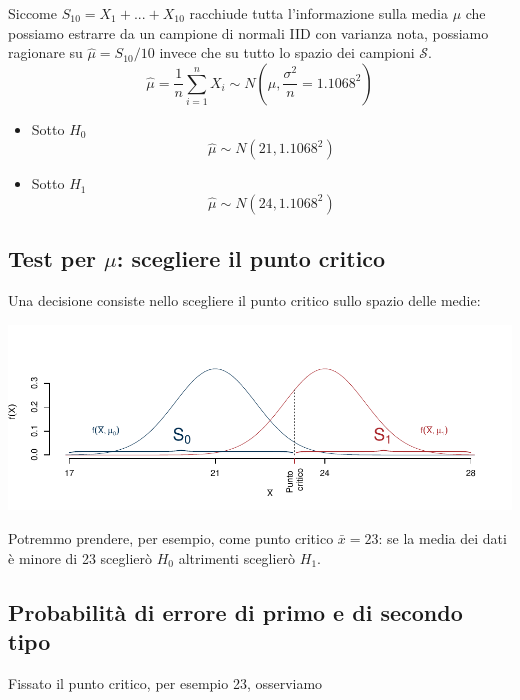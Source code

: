 \documentclass[
  11pt,
]{book}
\providecommand{\tightlist}{%
  \setlength{\itemsep}{0pt}\setlength{\parskip}{0pt}}
\theoremstyle{mytheoremstyle}
\theoremstyle{mydefstyle}
\begin{document}
Siccome \(S_{10}=X_1+...+X_{10}\) racchiude tutta l'informazione sulla media \(\mu\) che possiamo estrarre da un campione di normali IID con varianza nota, possiamo ragionare su \(\hat\mu=S_{10}/10\) invece che su tutto lo spazio dei campioni \(\mathcal{S}\).
\[\hat\mu=\frac 1 n \sum_{i=1}^n X_i\sim N\left(\mu,\frac{\sigma^2}{n}=1.1068^2\right)\]

\begin{itemize}
\tightlist
\item
  Sotto \(H_0\)
  \[\hat\mu\sim N(21,1.1068^2)\]
\item
  Sotto \(H_1\)
  \[\hat\mu\sim N(24,1.1068^2)\]
\end{itemize}

\subsection{\texorpdfstring{Test per \(\mu\): scegliere il punto critico}{Test per \textbackslash mu: scegliere il punto critico}}\label{test-per-mu-scegliere-il-punto-critico}

Una decisione consiste nello scegliere il punto critico sullo spazio delle medie:

\begin{center}\includegraphics{Appunti_di_Statistica_2025_files/figure-latex/14-test-intro-20-1} \end{center}

Potremmo prendere, per esempio, come punto critico \(\bar x=23\): se la media dei dati
è minore di 23 sceglierò \(H_0\) altrimenti sceglierò \(H_1\).

\subsection{Probabilità di errore di primo e di secondo tipo}\label{probabilituxe0-di-errore-di-primo-e-di-secondo-tipo}

Fissato il punto critico, per esempio 23, osserviamo
\end{document}
